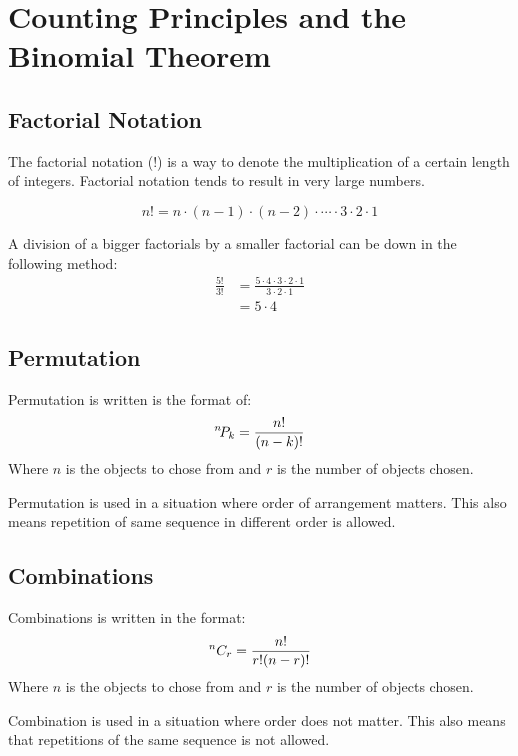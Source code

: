 \documentclass[../notes.tex]{subfiles}
\begin{document}
\section{Counting Principles and the Binomial Theorem}

\subsection{Factorial Notation}
The factorial notation ($!$) is a way to denote the multiplication of a certain length of integers.
Factorial notation tends to result in very large numbers.

\begin{equation}
	n! = n \cdot (n-1) \cdot (n-2) \cdot \cdots \cdot 3 \cdot 2 \cdot 1
\end{equation}

A division of a bigger factorials by a smaller factorial can be down in the following method:
\begin{align*}
	\frac{5!}{3!} &= \frac{5 \cdot 4 \cdot 3 \cdot 2 \cdot 1}{3 \cdot 2 \cdot 1} \\
				  &= 5 \cdot 4 
\end{align*} 

\subsection{Permutation}
Permutation is written is the format of:
\begin{equation}
	{}^{n}\!P_{k} = \frac{n!}{(n-k)!}
\end{equation}
Where $n$ is the objects to chose from and $r$ is the number of objects chosen.

Permutation is used in a situation where order of arrangement matters.
This also means repetition of same sequence in different order is allowed.

\subsection{Combinations}
Combinations is written in the format:
\begin{equation}
	{}^{n}C_{r} = \frac{n!}{r!(n-r)!}
\end{equation}
Where $n$ is the objects to chose from and $r$ is the number of objects chosen.

Combination is used in a situation where order does not matter.
This also means that repetitions of the same sequence is not allowed.
\end{document}
